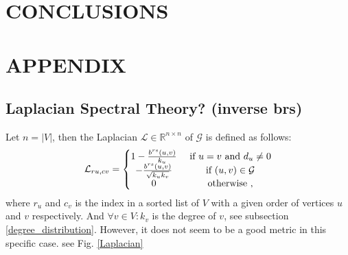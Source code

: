 \documentclass[letterpaper, 10 pt, conference]{ieeeconf}  %
\begin{document}

\section{CONCLUSIONS}



\addtolength{\textheight}{-12cm}   %







\section*{APPENDIX}


\subsection{Laplacian Spectral Theory? (\textbf{inverse brs})}
Let $n = |V|$, then the Laplacian $\mathcal{L} \in \mathbb{R}^{n \times n}$ of $\mathcal{G}$ is defined as follows:
\begin{equation}
\mathcal{L}_{ru,cv} = 
    \left\{\begin{matrix}
    1-\frac{b^{rs}(u,v)}{k_{u}} & \textup{ if } u=v \textup{ and } d_{u} \neq 0 \\ 
    -\frac{b^{rs}(u,v)}{\sqrt{k_{u} k_{v}}} & \textup{ if } (u,v) \in \mathcal{G} \\ 
    0 & \textup{ otherwise },
    \end{matrix}\right.
\end{equation}
where $r_{u}$ and $c_{v}$ is the index in a sorted list of $V$ with a given order of vertices $u$ and $v$ respectively. And $\forall v \in V \colon k_{v}$ is the degree of $v$, see subsection \ref{degree_distribution}. However, it does not seem to be a good metric in this specific case. see Fig. \ref{Laplacian}
\end{document}
